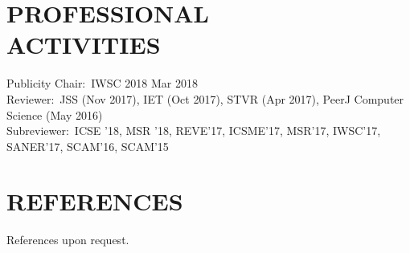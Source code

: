 \documentclass[margin, 10pt]{res} %
\begin{document}
\begin{resume}
\section{PROFESSIONAL \\ ACTIVITIES} 
Publicity Chair:~IWSC 2018 \hfill Mar 2018 \\
Reviewer:~JSS (Nov 2017), IET (Oct 2017), STVR (Apr 2017), PeerJ Computer Science (May 2016) \\
Subreviewer:~ICSE '18, MSR '18, REVE'17, ICSME'17, MSR'17, IWSC'17, SANER'17, SCAM'16, SCAM'15



\section{REFERENCES} 

References upon request.

\end{resume}
\end{document}
